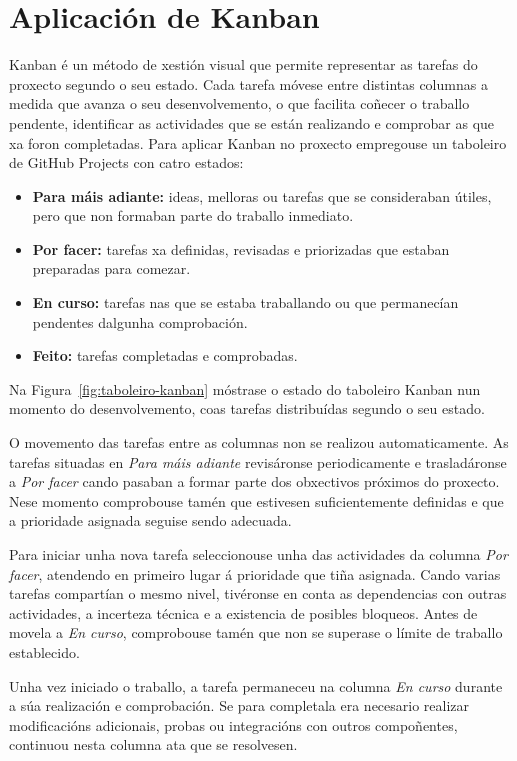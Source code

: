\section{Aplicación de Kanban}

Kanban é un método de xestión visual que permite representar as tarefas do proxecto segundo o seu estado. Cada tarefa móvese entre distintas columnas a medida que avanza o seu desenvolvemento, o que facilita coñecer o traballo pendente, identificar as actividades que se están realizando e comprobar as que xa foron completadas. Para aplicar Kanban no proxecto empregouse un taboleiro de GitHub Projects con catro estados:
\begin{itemize}
    \item \textbf{Para máis adiante:} ideas, melloras ou tarefas que se consideraban útiles, pero que non formaban parte do traballo inmediato.
    \item \textbf{Por facer:} tarefas xa definidas, revisadas e priorizadas que estaban preparadas para comezar.
    \item \textbf{En curso:} tarefas nas que se estaba traballando ou que permanecían pendentes dalgunha comprobación.
    \item \textbf{Feito:} tarefas completadas e comprobadas.
\end{itemize}

Na Figura~\ref{fig:taboleiro-kanban} móstrase o estado do taboleiro
Kanban nun momento do desenvolvemento, coas tarefas
distribuídas segundo o seu estado.

O movemento das tarefas entre as columnas non se realizou automaticamente. As tarefas situadas en \textit{Para máis adiante} revisáronse periodicamente e trasladáronse a \textit{Por facer} cando pasaban a formar parte dos obxectivos próximos do proxecto. Nese momento comprobouse tamén que estivesen suficientemente definidas e que a prioridade asignada seguise sendo adecuada.

Para iniciar unha nova tarefa seleccionouse unha das actividades da columna \textit{Por facer}, atendendo en primeiro lugar á prioridade que tiña asignada. Cando varias tarefas compartían o mesmo nivel, tivéronse en conta as dependencias con outras actividades, a incerteza técnica e a existencia de posibles bloqueos. Antes de movela a \textit{En curso}, comprobouse tamén que non se superase o límite de traballo establecido.

Unha vez iniciado o traballo, a tarefa permaneceu na columna \textit{En curso} durante a súa realización e comprobación. Se para completala era necesario realizar modificacións adicionais, probas ou integracións con outros compoñentes, continuou nesta columna ata que se resolvesen.

